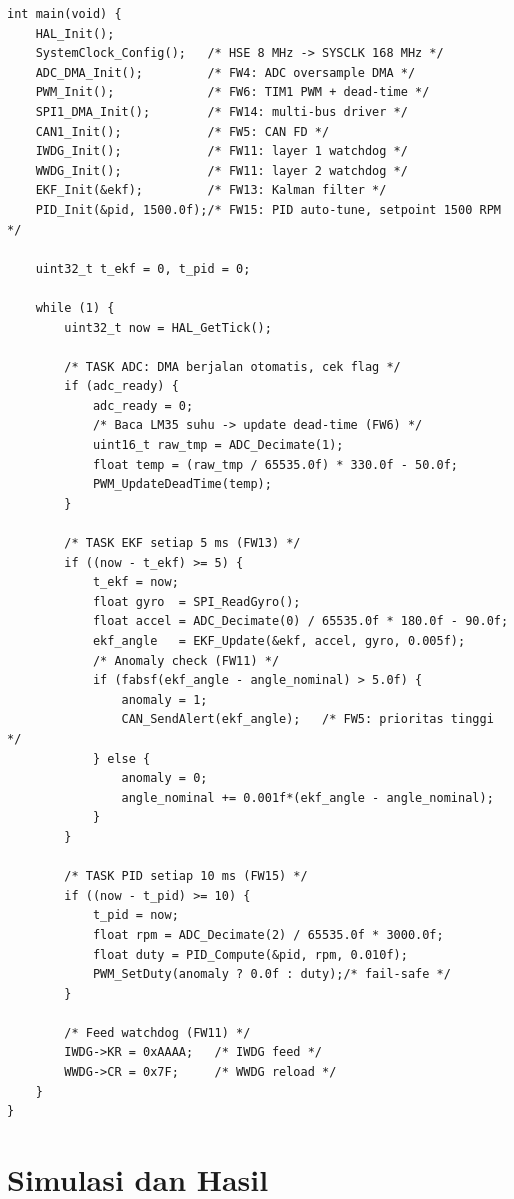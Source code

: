 \documentclass[12pt,a4paper]{article}
\begin{document}
\begin{lstlisting}[style=cstyle,
  caption={Main loop AMPS-EIS: Adaptive Scheduler + Watchdog (FW3, FW11).}]
int main(void) {
    HAL_Init();
    SystemClock_Config();   /* HSE 8 MHz -> SYSCLK 168 MHz */
    ADC_DMA_Init();         /* FW4: ADC oversample DMA */
    PWM_Init();             /* FW6: TIM1 PWM + dead-time */
    SPI1_DMA_Init();        /* FW14: multi-bus driver */
    CAN1_Init();            /* FW5: CAN FD */
    IWDG_Init();            /* FW11: layer 1 watchdog */
    WWDG_Init();            /* FW11: layer 2 watchdog */
    EKF_Init(&ekf);         /* FW13: Kalman filter */
    PID_Init(&pid, 1500.0f);/* FW15: PID auto-tune, setpoint 1500 RPM */

    uint32_t t_ekf = 0, t_pid = 0;

    while (1) {
        uint32_t now = HAL_GetTick();

        /* TASK ADC: DMA berjalan otomatis, cek flag */
        if (adc_ready) {
            adc_ready = 0;
            /* Baca LM35 suhu -> update dead-time (FW6) */
            uint16_t raw_tmp = ADC_Decimate(1);
            float temp = (raw_tmp / 65535.0f) * 330.0f - 50.0f;
            PWM_UpdateDeadTime(temp);
        }

        /* TASK EKF setiap 5 ms (FW13) */
        if ((now - t_ekf) >= 5) {
            t_ekf = now;
            float gyro  = SPI_ReadGyro();
            float accel = ADC_Decimate(0) / 65535.0f * 180.0f - 90.0f;
            ekf_angle   = EKF_Update(&ekf, accel, gyro, 0.005f);
            /* Anomaly check (FW11) */
            if (fabsf(ekf_angle - angle_nominal) > 5.0f) {
                anomaly = 1;
                CAN_SendAlert(ekf_angle);   /* FW5: prioritas tinggi */
            } else {
                anomaly = 0;
                angle_nominal += 0.001f*(ekf_angle - angle_nominal);
            }
        }

        /* TASK PID setiap 10 ms (FW15) */
        if ((now - t_pid) >= 10) {
            t_pid = now;
            float rpm = ADC_Decimate(2) / 65535.0f * 3000.0f;
            float duty = PID_Compute(&pid, rpm, 0.010f);
            PWM_SetDuty(anomaly ? 0.0f : duty);/* fail-safe */
        }

        /* Feed watchdog (FW11) */
        IWDG->KR = 0xAAAA;   /* IWDG feed */
        WWDG->CR = 0x7F;     /* WWDG reload */
    }
}
\end{lstlisting}

\newpage
\section{Simulasi dan Hasil}
\label{sec:simulasi}
\end{document}
